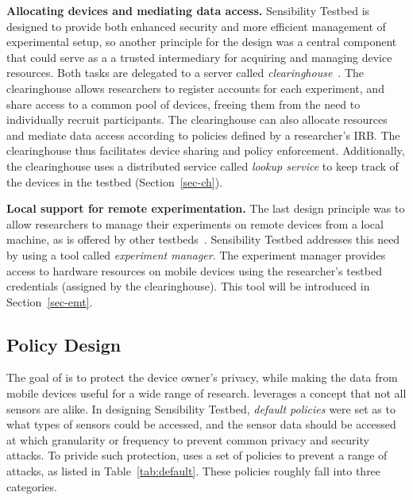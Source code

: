 \textbf{Allocating devices and mediating data access.}
Sensibility Testbed is designed to provide both enhanced security and 
more efficient management of experimental setup, so another principle 
for the design was a central component that could serve as a a trusted 
intermediary for acquiring and managing device resources. Both tasks 
are delegated to  a server called \textit{clearinghouse}~\cite{ch}. The 
clearinghouse allows researchers to 
register accounts for each experiment, and share access to a common 
pool of devices, freeing them from the need to individually recruit participants. 
The clearinghouse can also allocate resources and mediate 
data access according to policies defined by a researcher's IRB. The 
clearinghouse thus facilitates device sharing and policy enforcement.  
Additionally, the clearinghouse uses a distributed service called 
\textit{lookup service} to keep track of the devices in the testbed 
(Section~\ref{sec-ch}).

\textbf{Local support for remote experimentation.} 
The last design principle was to allow researchers to manage their 
experiments on remote devices from a local machine, as is offered 
by other testbeds~\cite{hibler2008large, peterson2006experiences}. Sensibility 
Testbed addresses this need by using a tool called \textit{experiment 
manager}. The experiment manager provides access to 
hardware resources on mobile devices using the researcher's testbed 
credentials (assigned by the clearinghouse). This tool will be introduced
in Section~\ref{sec-emt}.



\subsection{Policy Design}

The goal of \sysname is to protect the device owner's privacy, while making
the data from mobile devices useful for a wide range of research. \sysname
leverages a concept that not all sensors are alike. 
In designing Sensibility Testbed, \textit{default policies} were set as 
to what types of sensors could be accessed, and the sensor data should be
accessed at which granularity or frequency to prevent common privacy and
security attacks. To privide such protection, \sysname 
uses a set of policies to prevent a range of attacks, as listed in 
Table~\ref{tab:default}. These policies roughly fall into three categories.

